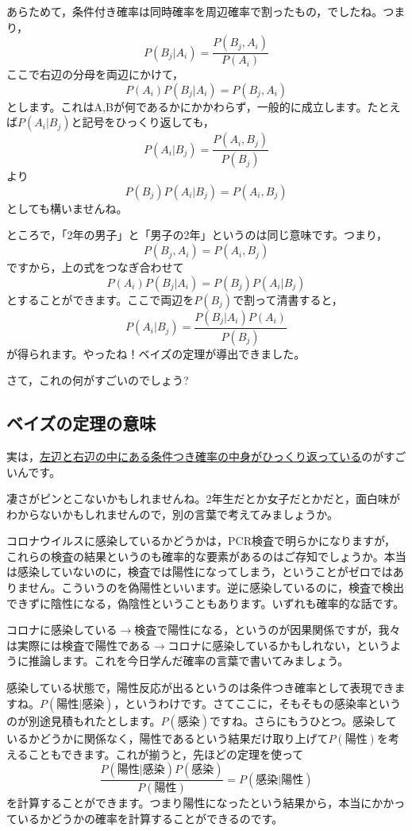 \documentclass{ltjsarticle}
\begin{document}
あらためて，条件付き確率は同時確率を周辺確率で割ったもの，でしたね。つまり，
$$ P(B_j | A_i) = \frac{P(B_j,A_i)}{P(A_i)}$$
ここで右辺の分母を両辺にかけて，
$$ P(A_i)P(B_j|A_i) = P(B_j,A_i)$$
とします。これはA,Bが何であるかにかかわらず，一般的に成立します。たとえば$P(A_i|B_j)$と記号をひっくり返しても，
$$ P(A_i|B_j) = \frac{P(A_i,B_j)}{P(B_j)}$$
より
$$P(B_j)P(A_i|B_j) = P(A_i,B_j)$$
としても構いませんね。


ところで，「2年の男子」と「男子の2年」というのは同じ意味です。つまり，
$$P(B_j,A_i) = P(A_i, B_j)$$
ですから，上の式をつなぎ合わせて
$$P(A_i)P(B_j|A_i) = P(B_j)P(A_i|B_j)$$
とすることができます。ここで両辺を$P(B_j)$で割って清書すると，
$$ P(A_i | B_j )=\frac{P(B_j|A_i)P(A_i)}{P(B_j)}$$
が得られます。やったね！ベイズの定理が導出できました。


さて，これの何がすごいのでしょう?
\subsection{ベイズの定理の意味}
実は，\underline{左辺と右辺の中にある条件つき確率の中身がひっくり返っている}のがすごいんです。

凄さがピンとこないかもしれませんね。2年生だとか女子だとかだと，面白味がわからないかもしれませんので，別の言葉で考えてみましょうか。

コロナウイルスに感染しているかどうかは，PCR検査で明らかになりますが，これらの検査の結果というのも確率的な要素があるのはご存知でしょうか。本当は感染していないのに，検査では陽性になってしまう，ということがゼロではありません。こういうのを偽陽性といいます。逆に感染しているのに，検査で検出できずに陰性になる，偽陰性ということもあります。いずれも確率的な話です。

コロナに感染している$\to$検査で陽性になる，というのが因果関係ですが，我々は実際には検査で陽性である$\to$コロナに感染しているかもしれない，というように推論します。これを今日学んだ確率の言葉で書いてみましょう。

感染している状態で，陽性反応が出るというのは条件つき確率として表現できますね。$P(\mbox{陽性}|\mbox{感染})$，というわけです。さてここに，そもそもの感染率というのが別途見積もれたとします。$P(\mbox{感染})$ですね。さらにもうひとつ。感染しているかどうかに関係なく，陽性であるという結果だけ取り上げて$P(\mbox{陽性})$を考えることもできます。これが揃うと，先ほどの定理を使って
$$ \frac{P(\mbox{陽性}|\mbox{感染})P(\mbox{感染})}{P(\mbox{陽性})} = P(\mbox{感染}|\mbox{陽性})$$
を計算することができます。つまり陽性になったという結果から，本当にかかっているかどうかの確率を計算することができるのです。
\end{document}
